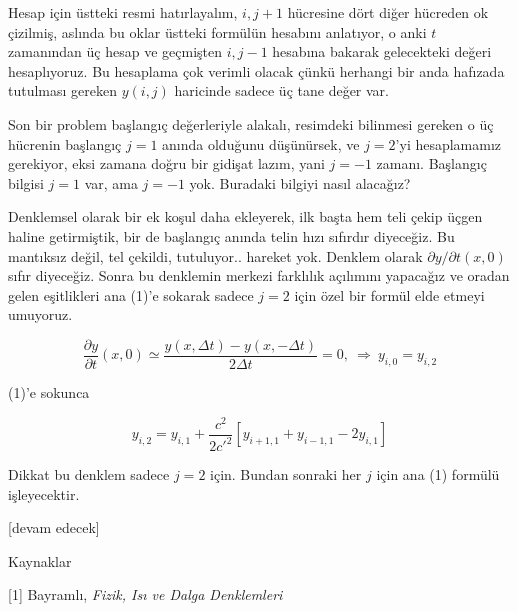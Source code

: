 \documentclass[12pt,fleqn]{article}\usepackage{../../common}
\begin{document}
Hesap için üstteki resmi hatırlayalım, $i,j+1$ hücresine dört diğer hücreden ok
çizilmiş, aslında bu oklar üstteki formülün hesabını anlatıyor, o anki $t$
zamanından üç hesap ve geçmişten $i,j-1$ hesabına bakarak gelecekteki değeri
hesaplıyoruz. Bu hesaplama çok verimli olacak çünkü herhangi bir anda hafızada
tutulması gereken $y(i,j)$ haricinde sadece üç tane değer var. 

Son bir problem başlangıç değerleriyle alakalı, resimdeki bilinmesi gereken o üç
hücrenin başlangıç $j=1$ anında olduğunu düşünürsek, ve $j=2$'yi hesaplamamız
gerekiyor, eksi zamana doğru bir gidişat lazım, yani $j=-1$ zamanı. Başlangıç
bilgisi $j=1$ var, ama $j=-1$ yok. Buradaki bilgiyi nasıl alacağız?

Denklemsel olarak bir ek koşul daha ekleyerek, ilk başta hem teli çekip üçgen
haline getirmiştik, bir de başlangıç anında telin hızı sıfırdır diyeceğiz. Bu
mantıksız değil, tel çekildi, tutuluyor.. hareket yok. Denklem olarak
$\partial y / \partial t(x,0)$ sıfır diyeceğiz. Sonra bu denklemin merkezi
farklılık açılımını yapacağız ve oradan gelen eşitlikleri ana (1)'e sokarak
sadece $j=2$ için özel bir formül elde etmeyi umuyoruz.

$$
\frac{\partial y}{\partial t}(x,0) \simeq
\frac{y(x, \Delta t)- y(x, -\Delta t)}{2\Delta t}=0, \
\Rightarrow \ y_{i, 0} = y_{i,2}
$$

(1)'e sokunca

$$
y_{i,2} = y_{i,1}+ \frac{c^2} {2c'^2}
\left [ y_{i+1,1}+y_{i-1,1}-2 y_{i,1}\right]
$$

Dikkat bu denklem sadece $j=2$ için. Bundan sonraki her $j$ için ana (1) formülü
işleyecektir.










[devam edecek]

Kaynaklar

[1] Bayramlı, {\em Fizik, Isı ve Dalga Denklemleri}
    
\end{document}
